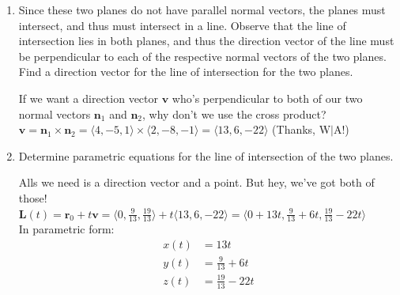 \documentclass[10pt]{article}
\newcommand{\vv}{\mathbf{v}}
\newcommand{\vn}{\mathbf{n}}
\newenvironment{red}{\color{red}}{\ignorespacesafterend}
\begin{document}
\begin{enumerate}[leftmargin=0pt]
\begin{enumerate}
	\begin{red}
		Let's solve both scalar equations for $z$, and then equate the two $z$'s. 
		\begin{align*}
			\textrm{Plane 1: } 4x - 5y + z &= -2 \\
			z &= -2 -4x + 5y \\
			\textrm{Plane 2: } 2x - 8y - z &= -7 \\
			z &= 2x - 8y + 7 \\
			-2 - 4x + 5y &= 2x - 8y + 7 \\
			6x -13y &= -9
			\intertext{Now we get to pick some value we want for one of these variables. How about $x=0$?}
			-13y &= -9 \\
			y &= \tfrac{9}{13}
			\intertext{Cool, so now we have the $x$- and $y$-coordinates of a point that's on both planes. Substituting back into one of our $z$ equations:}
			z &= -2 -4x +5y \\
			&= -2 -4(0) + 5(\tfrac{9}{13}) = \tfrac{19}{13}
		\end{align*}
		Therefore, $(0, \tfrac{9}{13}, \tfrac{19}{13})$ is a point that lies on both planes.
	\end{red}
	\item Since these two planes do not have parallel normal vectors, the planes must intersect, and thus must intersect in a line. Observe that the line of intersection lies in both planes, and thus the direction vector of the line must be perpendicular to each of the respective normal vectors of the two planes. Find a direction vector for the line of intersection for the two planes.
	
	\begin{red}
		If we want a direction vector $\vv$ who's perpendicular to both of our two normal vectors $\vn_1$ and $\vn_2$, why don't we use the cross product? \\
		$\vv = \vn_1 \times \vn_2 = \langle 4, -5, 1\rangle \times \langle 2, -8, -1 \rangle = \langle 13, 6, -22 \rangle$ (Thanks, W$|$A!)
	\end{red}
	\item Determine parametric equations for the line of intersection of the two planes.
	
	\begin{red}
		Alls we need is a direction vector and a point. But hey, we've got both of those! \\
		$\mathbf{L}(t) = \mathbf{r}_0 + t \vv 
		= \langle 0, \tfrac{9}{13}, \tfrac{19}{13} \rangle 
		+ t \langle 13, 6, -22 \rangle
		= \langle 0 + 13t, \tfrac{9}{13} + 6t, \tfrac{19}{13} - 22t \rangle$ \\
		In parametric form:
		\begin{align*}
			x(t) &= 13t\\
			y(t) &= \tfrac{9}{13} + 6t\\
			z(t) &= \tfrac{19}{13} - 22t
		\end{align*}
	\end{red}
\end{enumerate}


\end{enumerate}
\end{document}

